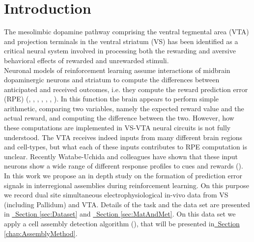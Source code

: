 \chapter{Introduction}
\label{chap:Introduction}
The mesolimbic dopamine pathway comprising the ventral tegmental area (VTA) and projection terminals in the ventral striatum (VS) has been identified as a critical neural system involved in processing both the rewarding and aversive behavioral effects of rewarded and unrewarded stimuli.\\Neuronal models of reinforcement learning assume interactions of midbrain dopaminergic neurons and striatum to compute the differences between anticipated and received outcomes, i.e. they compute the reward prediction error (RPE) (\cite{Schultz2001}, \cite{Schultz2002}, \cite{Fiorillo}, \cite{Eshel1}, \cite{Pagnoni}, \cite{Radua}, \cite{Takahashi2016}). In this function the brain appears to perform simple arithmetic, comparing two variables, namely the expected reward value and the actual reward, and computing the difference between the two. However, how these computations are implemented in VS-VTA neural circuits is not fully understood.
The VTA receives indeed inputs from many different brain regions and cell-types, but what each of these inputs contributes to RPE computation is unclear. Recently Watabe-Uchida and colleagues have shown that these input neurons show a wide range of different response profiles to cues and rewards (\cite{TianHuang}).\\In this work we propose an in depth study on the formation of prediction error signals in interregional assemblies during reinforcement learning. On this purpose we record dual site simultaneous electrophysiological in-vivo data from VS (including Pallidum) and VTA. Details of the task and the data set are presented in \hyperref[sec:Dataset]{~Section \ref*{sec:Dataset}} and \hyperref[sec:MatAndMet]{~Section \ref*{sec:MatAndMet}}. On this data set we apply a cell assembly detection algorithm (\cite{RussoDurstewitz}), that will be presented in\hyperref[chap:AssemblyMethod]{~Section \ref*{chap:AssemblyMethod}}.

